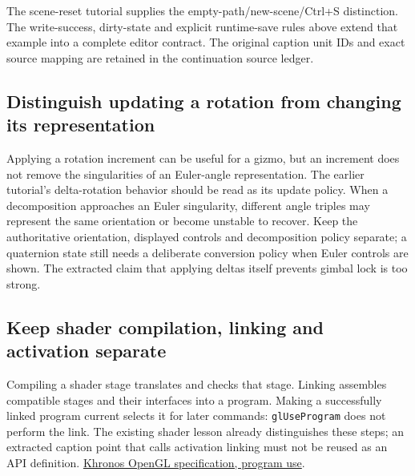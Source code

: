 The scene-reset tutorial supplies the empty-path/new-scene/Ctrl+S distinction. The write-success, dirty-state and explicit runtime-save rules above extend that example into a complete editor contract. The original caption unit IDs and exact source mapping are retained in the continuation source ledger.

\subsection{Distinguish updating a rotation from changing its representation}\label{06-engine-ii-ch046-distinguish-updating-a-rotation-from-changing-its-representation}

\hypertarget{06-engine-ii-ch046-distinguish-updating-a-rotation-from-changing-its-representation}{}

Applying a rotation increment can be useful for a gizmo, but an increment does not remove the singularities of an Euler-angle representation. The earlier tutorial's delta-rotation behavior should be read as its update policy. When a decomposition approaches an Euler singularity, different angle triples may represent the same orientation or become unstable to recover. Keep the authoritative orientation, displayed controls and decomposition policy separate; a quaternion state still needs a deliberate conversion policy when Euler controls are shown. The extracted claim that applying deltas itself prevents gimbal lock is too strong.

\subsection{Keep shader compilation, linking and activation separate}\label{06-engine-ii-ch046-keep-shader-compilation-linking-and-activation-separate}

\hypertarget{06-engine-ii-ch046-keep-shader-compilation-linking-and-activation-separate}{}

Compiling a shader stage translates and checks that stage. Linking assembles compatible stages and their interfaces into a program. Making a successfully linked program current selects it for later commands: \texttt{glUseProgram} does not perform the link. The existing shader lesson already distinguishes these steps; an extracted caption point that calls activation linking must not be reused as an API definition. \href{https://registry.khronos.org/OpenGL/specs/gl/glspec46.compatibility.pdf}{Khronos OpenGL specification, program use}.

